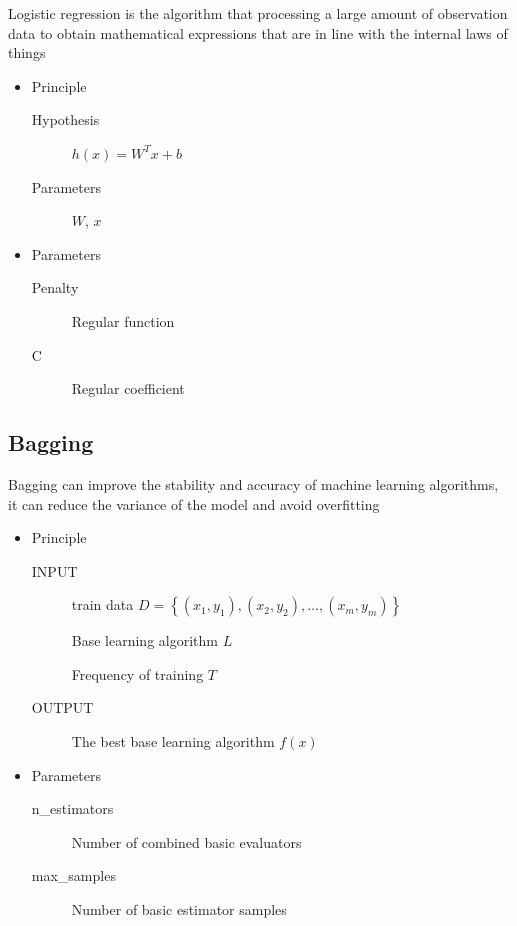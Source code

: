 Logistic regression is the algorithm that 
processing a large amount of 
observation data to 
obtain mathematical expressions 
that are in line with 
the internal laws of things

\begin{itemize}
	\item Principle
	
	\begin{description}
		\item[Hypothesis] $h(x)=W^{T} x+b$
		\item[Parameters] $ W$, $x$
	\end{description}
	
	\item Parameters
	
	\begin{description}
		\item[Penalty] Regular function
		\item[C] Regular coefficient
	\end{description}
	
\end{itemize}

\subsection{Bagging}


Bagging can improve the stability and accuracy 
of machine learning algorithms, 
it can reduce the variance of 
the model and avoid overfitting

\begin{itemize}
	\item Principle
	
	\begin{description}
		\item[INPUT] train data $ D = \left\{ 
		\left(x_1,y_1 \right), \left(x_2,y_2 \right),
		\dots,\left(x_m,y_m \right) \right\}$
		
		Base learning algorithm $L$
	
		Frequency of training $T$
		\item[OUTPUT] The best base learning algorithm $f(x)$
	
	\end{description}
	
	\item Parameters
	
	\begin{description}
		\item[n_estimators] Number of combined basic evaluators
		\item[max_samples] Number of basic estimator samples
	\end{description}
	
\end{itemize}

